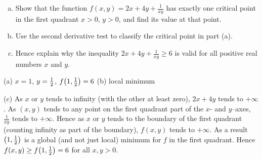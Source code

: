 \begin{question}[M200 2002A] %
\begin{enumerate}[(a)]
\item
Show that the function 
$f(x,y)=2x+4y+\frac{1}{xy}$
has exactly one critical point in the first quadrant $x>0$, $y>0$, and
find its value at that point.

\item 
Use the second derivative test to classify the critical point in part (a).

\item 
Hence explain why the inequality $2x+4y+\frac{1}{xy}\ge 6$ 
is valid for all positive real numbers $x$ and $y$.
\end{enumerate}
\end{question}


\begin{answer}
(a) $x=1$, $y=\tfrac{1}{2}$, $f\big(1,\tfrac{1}{2}\big)=6$\qquad
(b) local minimum

(c) As $x$ or $y$ tends to infinity (with the other at least zero), 
$2x+4y$ tends to $+\infty$. As $(x,y)$ tends to any point on the first quadrant part of the $x$- and $y$--axes, $\frac{1}{xy}$ tends to $+\infty$.  
Hence as $x$ or $y$ tends to the boundary of the first quadrant 
(counting infinity as part of the boundary), $f(x,y)$ tends to $+\infty$. 
As a result $\big(1,\tfrac{1}{2}\big)$ is a global (and not just local) minimum 
for $f$ in the first quadrant. Hence $f(x,y)\ge f\big(1,\tfrac{1}{2}\big)=6$ 
for all $x,y>0$. 
\end{answer}

